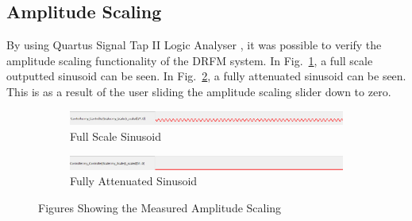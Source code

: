 \subsection{Amplitude Scaling}
	\noindent By using Quartus Signal Tap II Logic Analyser \cite{Signal_Tap}, it was possible to verify the amplitude scaling functionality of the DRFM system. In Fig.~\ref{fig:full_scale}, a full scale outputted sinusoid can be seen. In Fig.~\ref{fig:attentuated}, a fully attenuated sinusoid can be seen. This is as a result of the user sliding the amplitude scaling slider down to zero.
	\begin{figure}[h!]
	\centering
	\begin{subfigure}[b]{0.55\textwidth}
		\centering
		\includegraphics[width=.9\linewidth]{img/full_scale}
		\caption{Full Scale Sinusoid}
		\label{fig:full_scale}
	\end{subfigure}%


	\begin{subfigure}[b]{0.55\textwidth}
		\centering
		\includegraphics[width=.9\linewidth]{img/attenuated}
		\caption{Fully Attenuated Sinusoid}
		\label{fig:attentuated}
	\end{subfigure}
	\caption{Figures Showing the Measured Amplitude Scaling}
	\label{fig:amp}
\end{figure}

